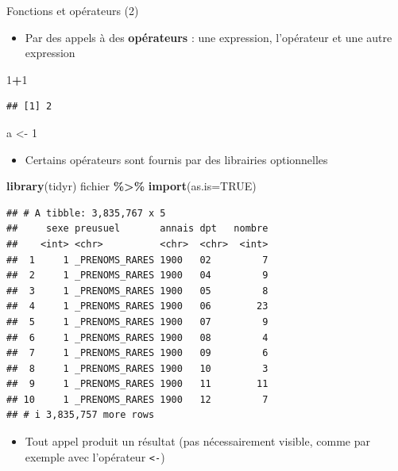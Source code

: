 \documentclass[
  ignorenonframetext,
]{beamer}
\newenvironment{Shaded}{\begin{snugshade}}{\end{snugshade}}
\newcommand{\AttributeTok}[1]{\textcolor[rgb]{0.13,0.29,0.53}{#1}}
\newcommand{\ConstantTok}[1]{\textcolor[rgb]{0.56,0.35,0.01}{#1}}
\newcommand{\DecValTok}[1]{\textcolor[rgb]{0.00,0.00,0.81}{#1}}
\newcommand{\FunctionTok}[1]{\textcolor[rgb]{0.13,0.29,0.53}{\textbf{#1}}}
\newcommand{\NormalTok}[1]{#1}
\newcommand{\OtherTok}[1]{\textcolor[rgb]{0.56,0.35,0.01}{#1}}
\newcommand{\SpecialCharTok}[1]{\textcolor[rgb]{0.81,0.36,0.00}{\textbf{#1}}}
\providecommand{\tightlist}{%
  \setlength{\itemsep}{0pt}\setlength{\parskip}{0pt}}
\begin{document}
\begin{frame}[fragile]{Fonctions et opérateurs (2)}
\protect\hypertarget{fonctions-et-opuxe9rateurs-2}{}
\begin{itemize}
\tightlist
\item
  Par des appels à des \textbf{opérateurs} : une expression, l'opérateur
  et une autre expression
\end{itemize}

\tiny

\begin{Shaded}
\begin{Highlighting}[]
\DecValTok{1}\SpecialCharTok{+}\DecValTok{1}
\end{Highlighting}
\end{Shaded}

\begin{verbatim}
## [1] 2
\end{verbatim}

\begin{Shaded}
\begin{Highlighting}[]
\NormalTok{a }\OtherTok{\textless{}{-}} \DecValTok{1}
\end{Highlighting}
\end{Shaded}

\normalsize

\begin{itemize}
\tightlist
\item
  Certains opérateurs sont fournis par des librairies optionnelles
\end{itemize}

\tiny

\begin{Shaded}
\begin{Highlighting}[]
\FunctionTok{library}\NormalTok{(tidyr)}
\NormalTok{fichier }\SpecialCharTok{\%\textgreater{}\%} \FunctionTok{import}\NormalTok{(}\AttributeTok{as.is=}\ConstantTok{TRUE}\NormalTok{)}
\end{Highlighting}
\end{Shaded}

\begin{verbatim}
## # A tibble: 3,835,767 x 5
##     sexe preusuel       annais dpt   nombre
##    <int> <chr>          <chr>  <chr>  <int>
##  1     1 _PRENOMS_RARES 1900   02         7
##  2     1 _PRENOMS_RARES 1900   04         9
##  3     1 _PRENOMS_RARES 1900   05         8
##  4     1 _PRENOMS_RARES 1900   06        23
##  5     1 _PRENOMS_RARES 1900   07         9
##  6     1 _PRENOMS_RARES 1900   08         4
##  7     1 _PRENOMS_RARES 1900   09         6
##  8     1 _PRENOMS_RARES 1900   10         3
##  9     1 _PRENOMS_RARES 1900   11        11
## 10     1 _PRENOMS_RARES 1900   12         7
## # i 3,835,757 more rows
\end{verbatim}

\normalsize

\begin{itemize}
\tightlist
\item
  Tout appel produit un résultat (pas nécessairement visible, comme par
  exemple avec l'opérateur \texttt{\textless{}-})
\end{itemize}
\end{frame}
\end{document}

